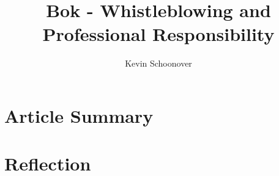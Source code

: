 \documentclass[12pt]{article}
\begin{document}
\title{Bok - Whistleblowing and Professional Responsibility}
\author{Kevin Schoonover}

\maketitle

\section{Article Summary}

\section{Reflection}



\end{document}
